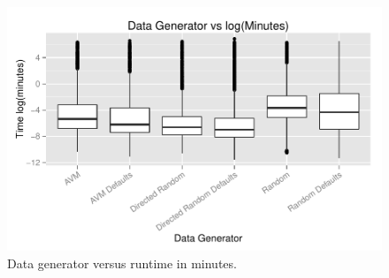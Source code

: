 \begin{figure}
\centering
  \centering
  \includegraphics[width=1\linewidth]{diagrams/DataGeneratorvsTime.pdf}
  \caption{Data generator versus runtime in minutes.\vspace{-.15in}}
  \label{fig:datas}
  \vspace{-.15in}
\end{figure}


